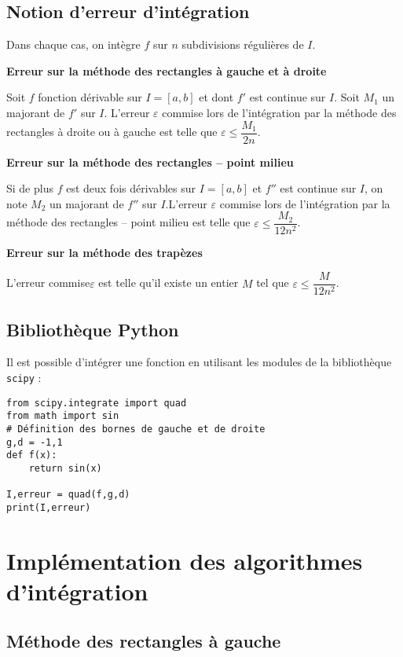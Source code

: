 \subsection{Notion d'erreur d'intégration}
\begin{resultat}
Dans chaque cas,  on intègre $f$ sur $n$ subdivisions régulières de $I$. 

\textbf{Erreur sur la méthode des rectangles à gauche et à droite}

Soit $f$ fonction dérivable sur $I=[a,b]$ et dont $f'$ est continue sur $I$. Soit $M_1$ un majorant de $f'$ sur $I$. L'erreur $\varepsilon$ commise lors de l'intégration par la méthode des rectangles à droite ou à gauche
 est telle que $ \varepsilon \leq \dfrac{M_1}{2n}$.

\textbf{Erreur sur la méthode des rectangles -- point milieu}

Si de plus $f$ est deux fois dérivables sur $I=[a,b]$ et $f''$ est continue sur $I$, on note $M_2$ un majorant de $f''$ sur $I$.L'erreur $\varepsilon$ commise lors de l'intégration par la méthode des rectangles -- point milieu est telle que $ \varepsilon \leq \dfrac{M_2}{12n^2}$.

\textbf{Erreur sur la méthode des trapèzes}

L'erreur commise$\varepsilon$ est telle qu'il existe un entier $M$ tel que $ \varepsilon \leq \dfrac{M}{12n^2}$.

\end{resultat}


\subsection{Bibliothèque Python}
Il est possible d'intégrer une fonction en utilisant les modules de la bibliothèque \texttt{scipy} :
\begin{lstlisting}
from scipy.integrate import quad
from math import sin
# Définition des bornes de gauche et de droite
g,d = -1,1 
def f(x):
    return sin(x)
   
I,erreur = quad(f,g,d)
print(I,erreur)
\end{lstlisting}

\section{Implémentation des algorithmes d'intégration}
\subsection{Méthode des rectangles à gauche}

